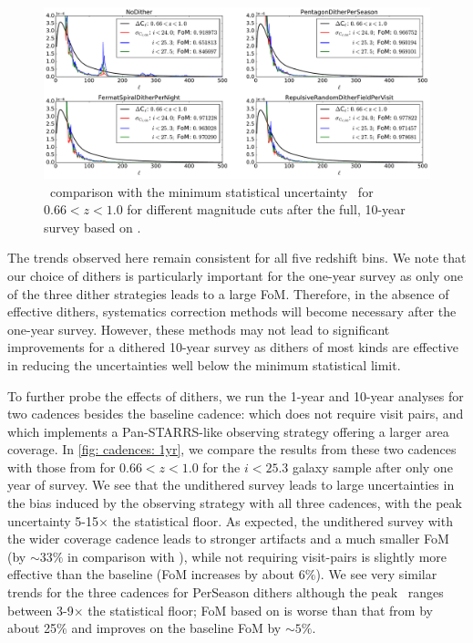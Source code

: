 \begin{figure}[!htb]
      \centering\hspace*{1em}\includegraphics[width=\linewidth]{figs/awan_10yr_minion1016_3magCuts.pdf}
       \vspace*{-2em}
\caption{\sigmaOS\ comparison with the minimum statistical uncertainty \statFloor\ for $0.66<z<1.0$ for different magnitude cuts after the full, 10-year survey based on .}
\label{fig: minion1016: 10yr}
\end{figure}

The trends observed here remain consistent for all five redshift bins. We note that our choice of dithers is particularly important for the one-year survey as only one of the three dither strategies leads to a large FoM. Therefore, in the absence of effective dithers, systematics correction methods will become necessary after the one-year survey. However, these methods may not lead to significant improvements for a dithered 10-year survey as dithers of most kinds are effective in reducing the uncertainties well below the minimum statistical limit.

To further probe the effects of dithers, we run the 1-year and 10-year analyses for two cadences besides the baseline cadence:  which does not require visit pairs, and  which implements a Pan-STARRS-like observing strategy offering a larger area coverage. In \autoref{fig: cadences: 1yr}, we compare the results from these two cadences with those from  for $0.66<z<1.0$ for the  $i<25.3$ galaxy sample after only one year of survey. We see that the undithered survey leads to large uncertainties in the bias induced by the observing strategy with all three cadences, with the peak uncertainty 5-15$\times$ the statistical floor. As expected, the undithered survey with the wider coverage  cadence leads to stronger artifacts and a much smaller FoM (by $\sim33\%$ in comparison with ), while not requiring visit-pairs is slightly more effective than the baseline (FoM increases by about 6$\%$). We see very similar trends for the three cadences for PerSeason dithers although the peak \sigmaOS\ ranges between 3-9$\times$ the statistical floor; FoM based on  is worse than that from  by about 25$\%$ and   improves on the baseline FoM by $\sim5\%$.

